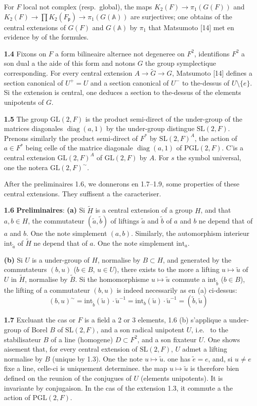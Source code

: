 \documentclass[12pt,a4paper]{article}
\theoremstyle{plain}
\theoremstyle{definition}
\theoremstyle{remark}
\DeclareMathOperator{\diag}{diag}
\newcommand{\Af}{\mathbb{A}}
\newcommand{\frakp}{\mathfrak{p}}
\newcommand{\wt}{\widetilde}
\providecommand{\frakp}{\mathfrak{p}}
\begin{document}
For $F$ local not complex (resp.\ global), the maps $K_2(F) \to \pi_1(G(F))$ and $K_2(F) \to \prod K_2(F_\frakp) \to \pi_1(G(\Af))$ are surjectives; one obtains of the central extensions of $G(F)$ and $G(\Af)$ by $\pi_1$ that Matsumoto [14] met en evidence by of the formules.

\textbf{1.4} Fixons on $F$ a form bilineaire alternee not degeneree on $F^2$, identifions $F^2$ a son dual a the aide of this form and notons $G$ the group symplectique corresponding. For every central extension $A \to \wt{G} \to G$, Matsumoto [14] defines a section canonical of $U^+ = U$ and a section canonical of $U^-$ to the-dessus of $U \setminus \{e\}$. Si the extension is central, one deduces a section to the-dessus of the elements unipotents of $G$.

\textbf{1.5} The group $\mathrm{GL}(2, F)$ is the product semi-direct of the under-group of the matrices diagonales $\diag(a, 1)$ by the under-group distingue $\mathrm{SL}(2, F)$. Prenons similarly the product semi-direct of $F^*$ by $\mathrm{SL}(2, F)^A$, the action of $a \in F^*$ being celle of the matrice diagonale $\diag(a, 1)$ of $\mathrm{PGL}(2, F)$. C'is a central extension $\mathrm{GL}(2, F)^A$ of $\mathrm{GL}(2, F)$ by $A$. For $s$ the symbol universal, one the notera $\mathrm{GL}(2, F)^\sim$.

After the preliminaires 1.6, we donnerons en 1.7--1.9, some properties of these central extensions. They suffisent a the caracteriser.

\textbf{1.6} \textbf{Preliminaires}: \textbf{(a)} Si $\wt{H}$ is a central extension of a group $H$, and that $a, b \in H$, the commutateur $(\wt{a}, \wt{b})$ of liftings $\wt{a}$ and $\wt{b}$ of $a$ and $b$ ne depend that of $a$ and $b$. One the note simplement $(a, b)$. Similarly, the automorphism interieur $\mathrm{int}_{\wt{a}}$ of $\wt{H}$ ne depend that of $a$. One the note simplement $\mathrm{int}_a$.

\textbf{(b)} Si $U$ is a under-group of $H$, normalise by $B \subset H$, and generated by the commutateurs $(b, u)$ ($b \in B$, $u \in U$), there exists to the more a lifting $u \mapsto \wt{u}$ of $U$ in $\wt{H}$, normalise by $\wt{B}$. Si the homomorphisme $u \mapsto \wt{u}$ commute a $\mathrm{int}_{\wt{b}}$ ($b \in B$), the lifting of a commutateur $(b, u)$ is indeed necessarily as en (a) ci-dessus:
\[
(b, u)^\sim = \mathrm{int}_{\wt{b}}(\wt{u}) \cdot \wt{u}^{-1} = \mathrm{int}_b(\wt{u}) \cdot \wt{u}^{-1} = (\wt{b}, \wt{u})
\]

\textbf{1.7} Excluant the cas or $F$ is a field a 2 or 3 elements, 1.6 (b) s'applique a under-group of Borel $B$ of $\mathrm{SL}(2, F)$, and a son radical unipotent $U$, i.e.
\ to the stabilisateur $B$ of a line (homogene) $D \subset F^2$, and a son fixateur $U$. One shows aisement that, for every central extension of $\mathrm{SL}(2, F)$, $U$ admet a lifting normalise by $B$ (unique by 1.3). One the note $u \mapsto \wt{u}$. one has $\wt{e} = e$, and, si $u \neq e$ fixe a line, celle-ci is uniquement determinee. the map $u \mapsto \wt{u}$ is therefore bien defined on the reunion of the conjugues of $U$ (elements unipotents). It is invariante by conjugaison. In the cas of the extension 1.3, it commute a the action of $\mathrm{PGL}(2, F)$.
\end{document}
